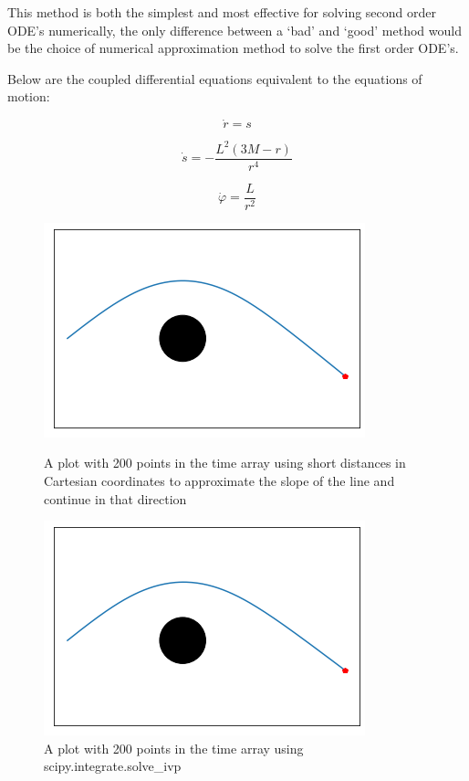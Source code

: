 \documentclass[oneside,openright,frontopenright]{dmathesis}
\begin{document}
	This method is both the simplest and most effective for solving second order ODE’s numerically, the only difference between a ‘bad’ and ‘good’ method would be the choice of numerical approximation method to solve the first order ODE’s.

	Below are the coupled differential equations equivalent to the equations of motion:

	\[\dot{r}= s\]

	\[\dot{s}=-\frac{L^2(3M-r)}{r^4}\]

	\[\dot{\varphi}=\frac{L}{r^2}\]

\begin{figure}
	\centering
	\begin{minipage}[b]{0.6\textwidth}
		\includegraphics[width=\textwidth]{img/points200byhand}
		\caption{A plot with 200 points in the time array using short distances in Cartesian coordinates to approximate the slope of the line and continue in that direction}
	\end{minipage}
	\hfill
	\begin{minipage}[b]{0.6\textwidth}
		\includegraphics[width=\textwidth]{img/points200scipy}
		\caption{A plot with 200 points in the time array using scipy.integrate.solve\_ivp}
	\end{minipage}
\end{figure}
\end{document}
